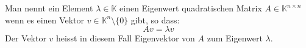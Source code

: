 Man nennt ein Element $\lambda \in \mathbb{K}$ einen Eigenwert quadratischen Matrix $A \in \mathbb{K}^{n \times n}$ wenn es einen Vektor $v \in \mathbb{K}^n \setminus \{0\}$ gibt, so dass:
$$A v = \lambda v$$
Der Vektor $v$ heisst in diesem Fall Eigenvektor von $A$ zum Eigenwert $\lambda$.
